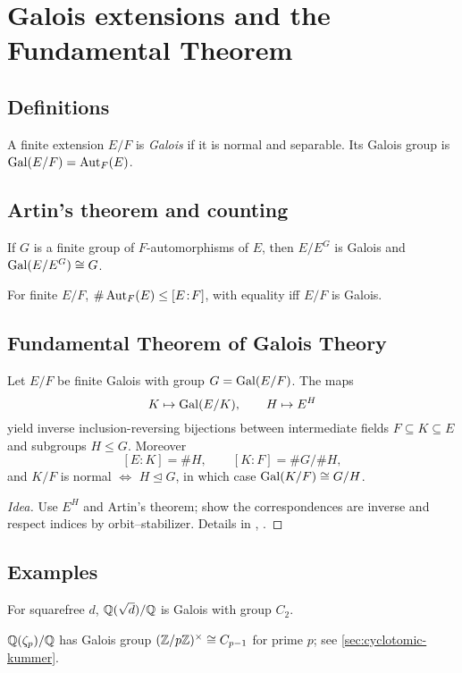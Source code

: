 \section{Galois extensions and the Fundamental Theorem}\label{sec:galois-ft}

\subsection{Definitions}
\begin{definition}
A finite extension $E/F$ is \emph{Galois} if it is normal and separable. Its Galois group is $\operatorname{Gal}(E/F)=\operatorname{Aut}_F(E)$.
\end{definition}

\subsection{Artin's theorem and counting}
\begin{theorem}[Artin]
If $G$ is a finite group of $F$-automorphisms of $E$, then $E/E^G$ is Galois and $\operatorname{Gal}(E/E^G)\cong G$.
\end{theorem}
\begin{theorem}[Counting]
For finite $E/F$, $\#\operatorname{Aut}_F(E)\le [E\!:\!F]$, with equality iff $E/F$ is Galois.
\end{theorem}

\subsection{Fundamental Theorem of Galois Theory}
\begin{theorem}\label{thm:FTGT}
Let $E/F$ be finite Galois with group $G=\operatorname{Gal}(E/F)$. The maps
\[
K\mapsto \operatorname{Gal}(E/K),\qquad H\mapsto E^H
\]
yield inverse inclusion-reversing bijections between intermediate fields $F\subseteq K\subseteq E$ and subgroups $H\le G$. Moreover
\[
[E\!:\!K]=\#H,\qquad [K\!:\!F]=\#G/\#H,
\]
and $K/F$ is normal $\iff$ $H\trianglelefteq G$, in which case $\operatorname{Gal}(K/F)\cong G/H$.
\end{theorem}
\begin{proof}[Idea]
Use $E^H$ and Artin's theorem; show the correspondences are inverse and respect indices by orbit–stabilizer. Details in \cite[\S14]{DF}, \cite[Ch.~VI]{Artin}.
\end{proof}

\subsection{Examples}
\begin{example}[Quadratic]
For squarefree $d$, $\mathbb{Q}(\sqrt d)/\mathbb{Q}$ is Galois with group $C_2$.
\end{example}
\begin{example}
$\mathbb{Q}(\zeta_p)/\mathbb{Q}$ has Galois group $(\mathbb{Z}/p\mathbb{Z})^\times\cong C_{p-1}$ for prime $p$; see \cref{sec:cyclotomic-kummer}.
\end{example}
